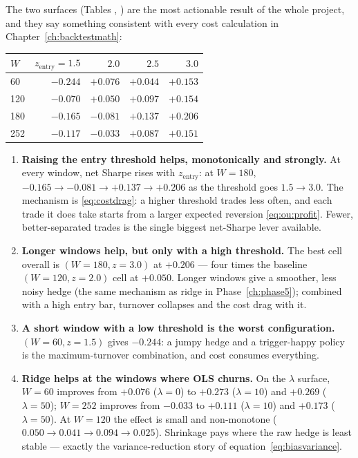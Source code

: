The two surfaces (Tables , )
are the most actionable result of the whole project, and they say something consistent
with every cost calculation in Chapter~\ref{ch:backtestmath}:

\begin{center}
\renewcommand{\arraystretch}{1.2}
\begin{tabular}{lrrrr}
\toprule
$W$ & $z_{\text{entry}}=1.5$ & $2.0$ & $2.5$ & $3.0$ \\
\midrule
60  & $-0.244$ & $+0.076$ & $+0.044$ & $+0.153$ \\
120 & $-0.070$ & $+0.050$ & $+0.097$ & $+0.154$ \\
180 & $-0.165$ & $-0.081$ & $+0.137$ & $\mathbf{+0.206}$ \\
252 & $-0.117$ & $-0.033$ & $+0.087$ & $+0.151$ \\
\bottomrule
\end{tabular}
\end{center}

\begin{enumerate}[label=\textbf{P\arabic*.}]
  \item \textbf{Raising the entry threshold helps, monotonically and strongly.} At every
    window, net Sharpe rises with $z_{\text{entry}}$: at $W=180$,
    $-0.165\to-0.081\to+0.137\to+0.206$ as the threshold goes $1.5\to3.0$. The mechanism
    is \eqref{eq:costdrag}: a higher threshold trades less often, and each trade it does
    take starts from a larger expected reversion
    \eqref{eq:ou:profit}. Fewer, better-separated trades is the single biggest net-Sharpe
    lever available.
  \item \textbf{Longer windows help, but only with a high threshold.} The best cell
    overall is $(W{=}180, z{=}3.0)$ at $+0.206$ --- four times the baseline
    $(W{=}120, z{=}2.0)$ cell at $+0.050$. Longer windows give a smoother, less noisy
    hedge (the same mechanism as ridge in Phase~\ref{ch:phase5}); combined with a high
    entry bar, turnover collapses and the cost drag with it.
  \item \textbf{A short window with a low threshold is the worst configuration.}
    $(W{=}60, z{=}1.5)$ gives $-0.244$: a jumpy hedge and a trigger-happy policy is the
    maximum-turnover combination, and cost consumes everything.
  \item \textbf{Ridge helps at the windows where OLS churns.} On the $\lambda$ surface,
    $W{=}60$ improves from $+0.076$ ($\lambda{=}0$) to $+0.273$ ($\lambda{=}10$) and
    $+0.269$ ($\lambda{=}50$); $W{=}252$ improves from $-0.033$ to $+0.111$
    ($\lambda{=}10$) and $+0.173$ ($\lambda{=}50$). At $W{=}120$ the effect is small and
    non-monotone ($0.050\to0.041\to0.094\to0.025$). Shrinkage pays where the raw hedge is
    least stable --- exactly the variance-reduction story of
    equation~\eqref{eq:biasvariance}.
\end{enumerate}

